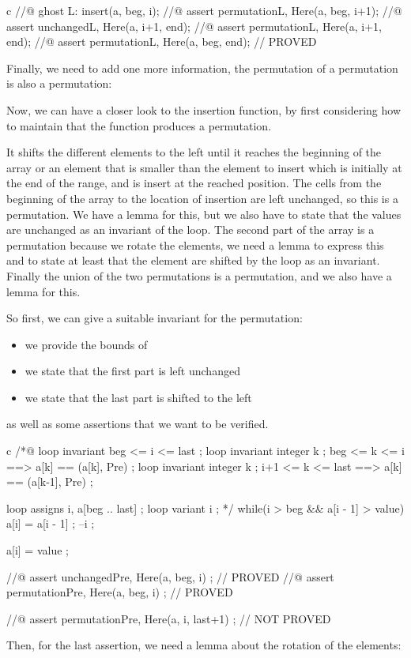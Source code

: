 \begin{CodeBlock}{c}
    //@ ghost L:
    insert(a, beg, i);
    //@ assert permutation{L, Here}(a, beg, i+1);
    //@ assert unchanged{L, Here}(a, i+1, end);
    //@ assert permutation{L, Here}(a, i+1, end);
    //@ assert permutation{L, Here}(a, beg, end); // PROVED
\end{CodeBlock}



Finally, we need to add one more information, the permutation of a permutation
is also a permutation:






Now, we can have a closer look to the insertion function, by first considering
how to maintain that the function produces a permutation.




It shifts the different elements to the left until it reaches the beginning of
the array or an element that is smaller than the element to insert which is
initially at the end of the range, and is insert at the reached position. The
cells from the beginning of the array to the location of insertion are left
unchanged, so this is a permutation. We have a lemma for this, but we also have
to state that the values are unchanged as an invariant of the loop. The second
part of the array is a permutation because we rotate the elements, we need a
lemma to express this and to state at least that the element are shifted by the
loop as an invariant. Finally the union of the two permutations is a permutation,
and we also have a lemma for this.



So first, we can give a suitable invariant for the permutation:

\begin{itemize}
\item we provide the bounds of 
\item we state that the first part is left unchanged
\item we state that the last part is shifted to the left
\end{itemize}

as well as some assertions that we want to be verified.



\begin{CodeBlock}{c}
  /*@
    loop invariant beg <= i <= last ;
    loop invariant \forall integer k ; beg <= k <= i    ==> a[k] == \at(a[k], Pre) ;
    loop invariant \forall integer k ; i+1 <= k <= last ==> a[k] == \at(a[k-1], Pre) ;

    loop assigns i, a[beg .. last] ;
    loop variant i ;
  */
  while(i > beg && a[i - 1] > value){
    a[i] = a[i - 1] ;
    --i ;
  }

  a[i] = value ;

  //@ assert unchanged{Pre, Here}(a, beg, i) ;   // PROVED
  //@ assert permutation{Pre, Here}(a, beg, i) ; // PROVED

  //@ assert permutation{Pre, Here}(a, i, last+1) ; // NOT PROVED
\end{CodeBlock}


Then, for the last assertion, we need a lemma about the rotation of the
elements:





